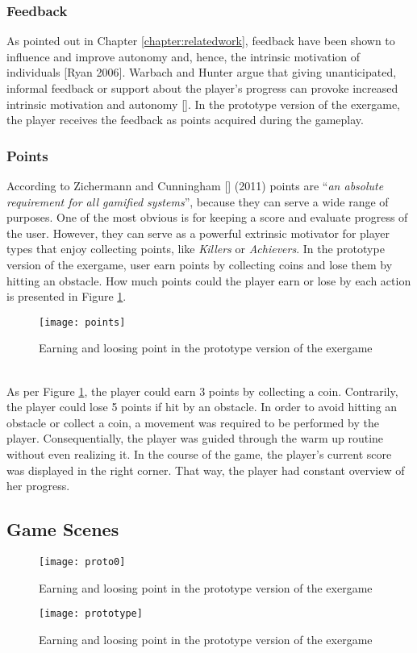 \subsubsection{Feedback}
As pointed out in Chapter \ref{chapter:relatedwork}, feedback have been shown to influence and improve autonomy and, hence, the intrinsic motivation of individuals [Ryan 2006]. Warbach and Hunter argue that giving unanticipated, informal feedback or support about the player's progress can provoke increased intrinsic motivation and autonomy []. In the prototype version of the exergame, the player receives the feedback as points acquired during the gameplay.
\subsubsection{Points}
According to Zichermann and Cunningham [] (2011) points are ``\textit{an absolute requirement for all gamified systems}'', because they can serve a wide range of purposes. One of the most obvious is for keeping a score and evaluate progress of the user. However, they can serve as a powerful extrinsic motivator for player types that enjoy collecting points, like \textit{Killers} or \textit{Achievers}. In the prototype version of the exergame, user earn points by collecting coins and lose them by hitting an obstacle. How much points could the player earn or lose by each action is presented in Figure \ref{fig:points}.\\
\begin{figure}[h]
    \centering
    \texttt{[image: points]}
    \caption{Earning and loosing point in the prototype version of the exergame}
    \label{fig:points}
\end{figure}\\
As per Figure \ref{fig:points}, the player could earn 3 points by collecting a coin. Contrarily, the player could lose 5 points if hit by an obstacle. In order to avoid hitting an obstacle or collect a coin, a movement was required to be performed by the player. Consequentially, the player was guided through the warm up routine without even realizing it. In the course of the game, the player's current score was displayed in the right corner. That way, the player had constant overview of her progress.  


\subsection{Game Scenes}


\begin{figure}[h]
    \centering
    \texttt{[image: proto0]}
    \caption{Earning and loosing point in the prototype version of the exergame}
    \label{fig:prototype_usage}
\end{figure}
\begin{figure}[h]
    \centering
    \texttt{[image: prototype]}
    \caption{Earning and loosing point in the prototype version of the exergame}
    \label{fig:prototype}
\end{figure}

